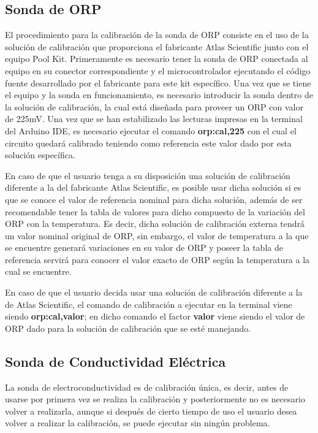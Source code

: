\subsection{Sonda de ORP}

El procedimiento para la calibración de la sonda de ORP consiste en el uso de la solución de calibración que proporciona el fabricante Atlas Scientific junto con el equipo Pool Kit. Primeramente es necesario tener la sonda 
de ORP conectada al equipo en su conector correspondiente y el microcontrolador ejecutando el código fuente desarrollado por el fabricante para este kit específico. Una vez que se tiene el equipo y la sonda en funcionamiento,
es necesario introducir la sonda dentro de la solución de calibración, la cual está diseñada para proveer un ORP con valor de 225mV. Una vez que se han estabilizado las lecturas impresas en la terminal del Arduino IDE, es 
necesario ejecutar el comando \textbf{orp:cal,225} con el cual el circuito quedará calibrado teniendo como referencia este valor dado por esta solución específica.

En caso de que el usuario tenga a su disposición una solución de calibración diferente a la del fabricante Atlas Scientific, es posible usar dicha solución si es que se conoce el valor de referencia nominal para dicha solución,
además de ser recomendable tener la tabla de valores para dicho compuesto de la variación del ORP con la temperatura. Es decir, dicha solución de calibración externa tendrá un valor nominal original de ORP, 
sin embargo, el valor de temperatura a la que se encuentre generará variaciones en su valor de ORP y poseer la tabla de referencia servirá para conocer el valor exacto de ORP según la temperatura a la cual se encuentre. 

En caso de que el usuario decida usar una solución de calibración diferente a la de Atlas Scientific, el comando de calibración a ejecutar en la terminal viene siendo \textbf{orp:cal,valor}; en dicho comando el factor 
\textbf{valor} viene siendo el valor de ORP dado para la solución de calibración que se esté manejando.

\subsection{Sonda de Conductividad Eléctrica}

La sonda de electroconductividad es de calibración única, es decir, antes de usarse por primera vez se realiza la calibración y posteriormente no es necesario volver a realizarla, aunque si después de cierto tiempo de uso 
el usuario desea volver a realizar la calibración, se puede ejecutar sin ningún problema.

